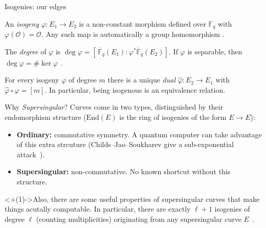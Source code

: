 \documentclass[10pt,aspectratio=169]{beamer}
\begin{document}
\begin{frame}{Isogenies: our edges}
  \begin{definition}[Isogeny]
    An \emph{isogeny} $\varphi\colon E_1 \to E_2$ is a non-constant morphism defined over $\mathbb{F}_q$
    with $\varphi(\mathcal{O}) = \mathcal{O}$. Any such map is automatically a group homomorphism
    \cite[III.4.8]{silverman}.
  \end{definition}
  \vspace{0.5em}
  \begin{definition}
    The \emph{degree} of $\varphi$ is $\deg\varphi = [\,\overline{\mathbb{F}}_q(E_1) : \varphi^{*}\overline{\mathbb{F}}_q(E_2)]$.
    If $\varphi$ is separable, then $\deg\varphi = \#\ker\varphi$ \cite[~III.4.10]{silverman}.
  \end{definition}
  \vspace{0.5em}
  \begin{theorem}
    For every isogeny $\varphi$ of degree $m$ there is a unique \emph{dual} $\hat\varphi\colon E_2 \to E_1$
    with $\hat\varphi \circ \varphi = [m]$. In particular, being isogenous is an equivalence relation.
  \end{theorem}
  \vspace{0.5em}
\end{frame}


\begin{frame}{Why \emph{Supersingular}?}
  Curves come in two types, distinguished by their endomorphism structure ($\text{End}(E)$ is the ring of isogenies of the form $E\to E$):
  \vspace{0.6em}
  \begin{itemize}[<+(1)->]
    \item \textbf{Ordinary:} \alert{commutative} symmetry. A quantum computer can take advantage of this extra strcuture (Childs--\alert{Jao}--Soukharev give a sub-exponential attack~\cite{cjs}).
    \item \textbf{Supersingular:} \alert{non-commutative}. No known shortcut without this structure.
  \end{itemize}
  \onslide<+(1)->{Also, there are some useful properties of supersingular curves that make things acutally computable.
  In particular, there are \alert{exactly $\ell+1$ isogenies of degree $\ell$} (counting multiplicities)
  originating from any supersingular curve $E$~\cite{sidh}.}
\end{frame}
\end{document}

